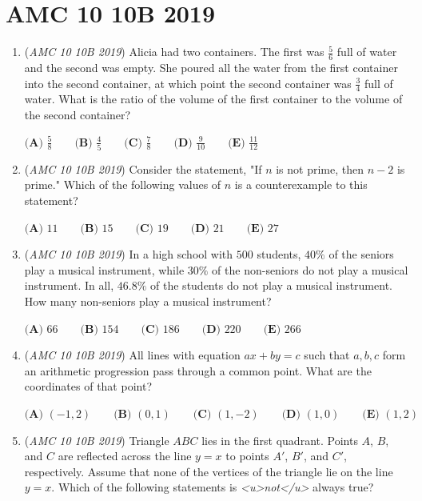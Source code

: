 \section{AMC 10 10B 2019}
        \begin{enumerate}
        	\item (\textit{AMC 10 10B 2019}) Alicia had two containers. The first was $\frac{5}{6}$ full of water and the second was empty. She poured all the water from the first container into the second container, at which point the second container was $\frac{3}{4}$ full of water. What is the ratio of the volume of the first container to the volume of the second container?


 $\textbf{(A) } \frac{5}{8} \qquad \textbf{(B) } \frac{4}{5} \qquad \textbf{(C) } \frac{7}{8} \qquad \textbf{(D) } \frac{9}{10} \qquad \textbf{(E) } \frac{11}{12}$


	\item (\textit{AMC 10 10B 2019}) Consider the statement, "If $n$ is not prime, then $n-2$ is prime." Which of the following values of $n$ is a counterexample to this statement?


 $\textbf{(A) } 11 \qquad \textbf{(B) } 15 \qquad \textbf{(C) } 19 \qquad \textbf{(D) } 21 \qquad \textbf{(E) } 27$


	\item (\textit{AMC 10 10B 2019}) In a high school with $500$ students, $40\%$ of the seniors play a musical instrument, while $30\%$ of the non-seniors do not play a musical instrument. In all, $46.8\%$ of the students do not play a musical instrument. How many non-seniors play a musical instrument?


 $\textbf{(A) } 66 \qquad\textbf{(B) } 154 \qquad\textbf{(C) } 186 \qquad\textbf{(D) } 220 \qquad\textbf{(E) } 266$


	\item (\textit{AMC 10 10B 2019}) All lines with equation $ax+by=c$ such that $a,b,c$ form an arithmetic progression pass through a common point. What are the coordinates of that point?


 $\textbf{(A) } (-1,2) \qquad\textbf{(B) } (0,1) \qquad\textbf{(C) } (1,-2) \qquad\textbf{(D) } (1,0) \qquad\textbf{(E) } (1,2)$


	\item (\textit{AMC 10 10B 2019}) Triangle $ABC$ lies in the first quadrant. Points $A$, $B$, and $C$ are reflected across the line $y=x$ to points $A'$, $B'$, and $C'$, respectively. Assume that none of the vertices of the triangle lie on the line $y=x$. Which of the following statements is \textit{<u>not</u>} always true?



\end{enumerate}
